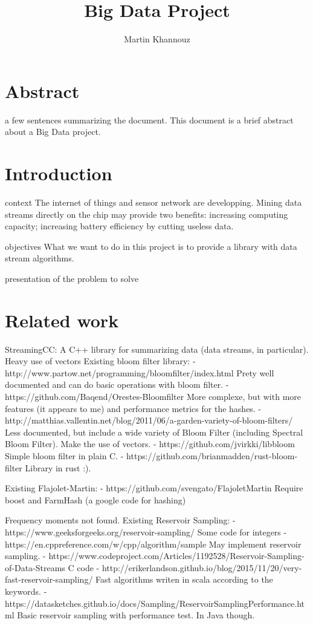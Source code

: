 \documentclass{article}
\title{Big Data Project}
\author{Martin Khannouz}
\begin{document}
\maketitle

\section*{Abstract}
a few sentences summarizing the document.
This document is a brief abstract about a Big Data project.
\section{Introduction}
context
	The internet of things and sensor network are developping.
	Mining data streams directly on the chip may provide two benefits:
	increasing computing capacity;
	increasing battery efficiency by cutting useless data.
	
objectives
	What we want to do in this project is to provide a library with data stream algorithms.

presentation of the problem to solve

\section{Related work}
	StreamingCC: A C++ library for summarizing data (data streams, in particular).
	Heavy use of vectors
Existing bloom filter library:
- http://www.partow.net/programming/bloomfilter/index.html
	Prety well documented and can do basic operations with bloom filter.
- https://github.com/Baqend/Orestes-Bloomfilter
	More complexe, but with more features (it appears to me) and performance metrics for the hashes.
- http://matthias.vallentin.net/blog/2011/06/a-garden-variety-of-bloom-filters/
	Less documented, but include a wide variety of Bloom Filter (including Spectral Bloom Filter).
	Make the use of vectors.
- https://github.com/jvirkki/libbloom
	Simple bloom filter in plain C.
- https://github.com/brianmadden/rust-bloom-filter
	Library in rust :).


Existing Flajolet-Martin:
- https://github.com/svengato/FlajoletMartin
	Require boost and FarmHash (a google code for hashing)

Frequency moments not found.
Existing Reservoir Sampling:
- https://www.geeksforgeeks.org/reservoir-sampling/
	Some code for integers
- https://en.cppreference.com/w/cpp/algorithm/sample
	May implement reservoir sampling.
- https://www.codeproject.com/Articles/1192528/Reservoir-Sampling-of-Data-Streams
	C code
- http://erikerlandson.github.io/blog/2015/11/20/very-fast-reservoir-sampling/
	Fast algorithms writen in scala according to the keywords.
- https://datasketches.github.io/docs/Sampling/ReservoirSamplingPerformance.html
	Basic reservoir sampling with performance test. In Java though.
\end{document}
